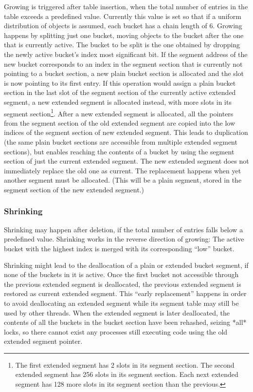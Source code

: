 \documentclass[aps,pre,preprint,nofootinbib]{revtex4}
\begin{document}
Growing is triggered after table insertion, when the total number of entries in the table exceeds a predefined value.
Currently this value is set so that if a uniform distribution of objects is assumed, each bucket has a chain length of 6.
Growing happens by splitting just one bucket, moving objects to the bucket after the one that is currently active.
The bucket to be split is the one obtained by dropping the newly active bucket's index most significant bit.
If the segment address of the new bucket corresponds to an index in the segment section that is currently not pointing to a bucket section, a new plain bucket section is allocated and the slot is now pointing to its first entry.
If this operation would assign a plain bucket section in the last slot of the segment section of the currently active extended segment, a new extended segment is allocated instead, with more slots in its segment section\footnote{
The first extended segment has 2 slots in its segment section.
The second extended segment has 256 slots in its segment section.
Each next extended segment has 128 more slots in its segment section than the previous.
}.
After a new extended segment is allocated, all the pointers from the segment section of the old extended segment are copied into the low indices of the segment section of new extended segment.
This leads to duplication (the same plain bucket sections are accessible from multiple extended segment sections), but enables reaching the contents of a bucket by using the segment section of just the current extended segment.
The new extended segment does not immediately replace the old one as current.
The replacement happens when yet another segment must be allocated.
(This will be a plain segment, stored in the segment section of the new extended segment.)

\subsubsection{Shrinking}

Shrinking may happen after deletion, if the total number of entries falls below a predefined value.
Shrinking works in the reverse direction of growing:
The active bucket with the highest index is merged with its corresponding ``low'' bucket.

Shrinking might lead to the deallocation of a plain or extended bucket segment, if none of the buckets in it is active.
Once the first bucket not accessible through the previous extended segment is deallocated, the previous extended segment is restored as current extended segment.
This ``early replacement'' happens in order to avoid deallocating an extended segment while its segment table may still be used by other threads.
When the extended segment is later deallocated, the contents of all the buckets in the bucket section have been rehashed, seizing *all* locks, so there cannot exist any processes still executing code using the old extended segment pointer.
\end{document}
